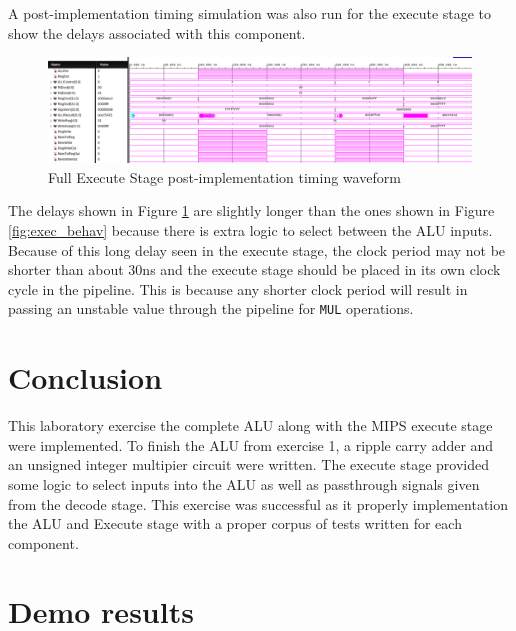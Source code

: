 \documentclass[CMPE]{../KGCOEReport}
\def\code#1{\texttt{#1}}
\begin{document}
   	A post-implementation timing simulation was also run for the
   	execute stage to show the delays associated with this component.

	\begin{figure}[h!]
        \centering
        \includegraphics[width=\textwidth]{img/exec_2_impl}
        \caption{Full Execute Stage post-implementation timing waveform}
        \label{fig:exec_impl}
    \end{figure}
    
    The delays shown in Figure \ref{fig:exec_impl} are slightly
    longer than the ones shown in Figure \ref{fig:exec_behav}
    because there is extra logic to select between the ALU inputs.
    Because of this long delay seen in the execute stage, the clock
    period may not be shorter than about 30ns and the execute stage
    should be placed in its own clock cycle in the pipeline. This is because
    any shorter clock period will result in passing an unstable value through
    the pipeline for \code{MUL} operations.
    

    \section*{Conclusion}
    This laboratory exercise the complete ALU along with the MIPS execute
    stage were implemented. To finish the ALU from exercise 1, a ripple carry
    adder and an unsigned integer multipier circuit were written. The execute
    stage provided some logic to select inputs into the ALU as well as passthrough
    signals given from the decode stage. This exercise was successful as it
    properly implementation the ALU and Execute stage with a proper corpus of
    tests written for each component.

    \pagebreak

    \section*{Demo results}
    
\end{document}
